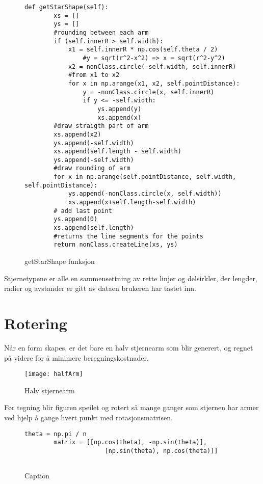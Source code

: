 \begin{figure}


 \lstset{language=Python, breaklines=true,} 
\begin{lstlisting}[frame=single]  
   def getStarShape(self):
        xs = []
        ys = []
        #rounding between each arm
        if (self.innerR > self.width):
            x1 = self.innerR * np.cos(self.theta / 2)
                #y = sqrt(r^2-x^2) => x = sqrt(r^2-y^2)
            x2 = nonClass.circle(-self.width, self.innerR)
            #from x1 to x2
            for x in np.arange(x1, x2, self.pointDistance):
                y = -nonClass.circle(x, self.innerR)
                if y <= -self.width:
                    ys.append(y)
                    xs.append(x)
        #draw straigth part of arm
        xs.append(x2)
        ys.append(-self.width)
        xs.append(self.length - self.width)
        ys.append(-self.width)
        #draw rounding of arm
        for x in np.arange(self.pointDistance, self.width, self.pointDistance):
            ys.append(-nonClass.circle(x, self.width))
            xs.append(x+self.length-self.width)
        # add last point     
        ys.append(0)
        xs.append(self.length)
        #returns the line segments for the points
        return nonClass.createLine(xs, ys)

\end{lstlisting}
    \caption{getStarShape funksjon}
    \label{fig:my_label}
\end{figure}
Stjernetypene er alle en sammensettning av rette linjer og delsirkler, der lengder, radier og avstander er gitt av dataen brukeren har tastet inn.

\clearpage
\section{Rotering}
Når en form skapes, er det bare en halv stjernearm som blir generert, og regnet på videre for å minimere beregningskostnader. \\
\begin{figure}[H]
    \centering
    \texttt{[image: halfArm]}
    \caption{Halv stjernearm}
    \label{fig:my_label}
\end{figure}



\noindent
Før tegning blir figuren speilet og rotert så mange ganger som stjernen har armer ved hjelp å gange hvert punkt med rotasjonsmatrisen.

\begin{figure}
    \lstset{language=Python, breaklines=true,} 
    \begin{lstlisting}[frame=single]  
        theta = np.pi / n
        matrix = [[np.cos(theta), -np.sin(theta)],
                      [np.sin(theta), np.cos(theta)]]
    
    \end{lstlisting}
    \caption{Caption}
    \label{fig:my_label}
\end{figure}

